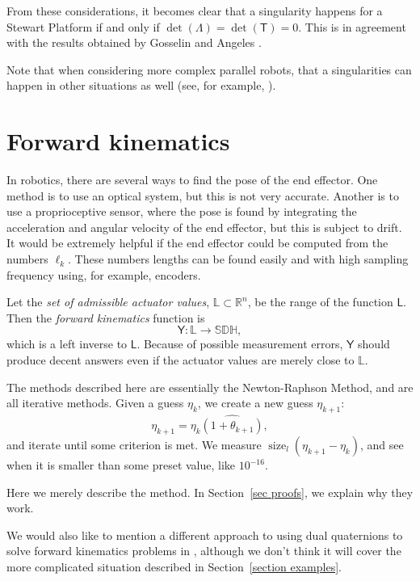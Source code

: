\documentclass[reqno,12pt]{amsart}
\newcommand\setunitdualquat{\mathbb S\mathbb D\mathbb H}
\DeclareMathOperator\size{{size}}
\begin{document}
From these considerations, it becomes clear that a singularity happens for a Stewart Platform if and only if $\det(\mathsf \Lambda) = \det(\mathsf T) = 0$.  This is in agreement with the results obtained by Gosselin and Angeles \cite{gosselin-angeles}.

Note that when considering more complex parallel robots, that a singularities can happen in other situations as well (see, for example, \cite{merlet}).

\section{Forward kinematics}
\label{sec forward kinematics}

In robotics, there are several ways to find the pose of the end effector.  One method is to use an optical system, but this is not very accurate.  Another is to use a proprioceptive sensor, where the pose is found by integrating the acceleration and angular velocity of the end effector, but this is subject to drift.  It would be extremely helpful if the end effector could be computed from the numbers $\ell_k$.  These numbers lengths can be found easily and with high sampling frequency using, for example, encoders.

Let the \emph{set of admissible actuator values}, $\mathbb L \subset \mathbb R^n$, be the range of the function $\mathsf L$.  Then the \emph{forward kinematics} function is
\begin{equation}
\mathsf Y : \mathbb L \to \setunitdualquat,
\end{equation}
 which is a left inverse to $\mathsf L$.  Because of possible measurement errors, $\mathsf Y$ should produce decent answers even if the actuator values are merely close to $\mathbb L$.

The methods described here are essentially the Newton-Raphson Method, and are all iterative methods.  Given a guess $\eta_k$, we create a new guess $\eta_{k+1}$:
\begin{equation}
\eta_{k+1} = \eta_k \widehat{(1 + \theta_{k+1})},
\end{equation}
and iterate until some criterion is met.  We measure $\size_l(\eta_{k+1} - \eta_k)$, and see when it is smaller than some preset value, like $10^{-16}$.

Here we merely describe the method.  In Section~\ref{sec proofs}, we explain why they work.

We would also like to mention a different approach to using dual quaternions to solve forward kinematics problems in \cite{yang-et-al}, although we don't think it will cover the more complicated situation described in Section~\ref{section examples}.
\end{document}
